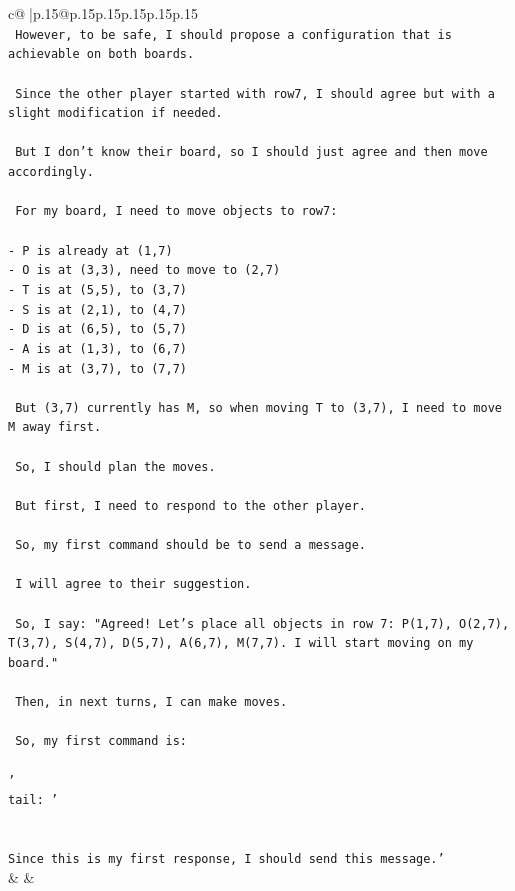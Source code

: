 \documentclass{article}
\begin{document}
{\begin{supertabular}{c@{$\;$}|p{.15\linewidth}@{}p{.15\linewidth}p{.15\linewidth}p{.15\linewidth}p{.15\linewidth}p{.15\linewidth}}
{{{\\ 
\texttt{ However, to be safe, I should propose a configuration that is achievable on both boards.} \\
\\ 
\texttt{ Since the other player started with row7, I should agree but with a slight modification if needed.} \\
\\ 
\texttt{ But I don't know their board, so I should just agree and then move accordingly.} \\
\\ 
\texttt{ For my board, I need to move objects to row7:} \\
\\ 
\texttt{{-} P is already at (1,7)} \\
\texttt{{-} O is at (3,3), need to move to (2,7)} \\
\texttt{{-} T is at (5,5), to (3,7)} \\
\texttt{{-} S is at (2,1), to (4,7)} \\
\texttt{{-} D is at (6,5), to (5,7)} \\
\texttt{{-} A is at (1,3), to (6,7)} \\
\texttt{{-} M is at (3,7), to (7,7)} \\
\\ 
\texttt{ But (3,7) currently has M, so when moving T to (3,7), I need to move M away first.} \\
\\ 
\texttt{ So, I should plan the moves.} \\
\\ 
\texttt{ But first, I need to respond to the other player.} \\
\\ 
\texttt{ So, my first command should be to send a message.} \\
\\ 
\texttt{ I will agree to their suggestion.} \\
\\ 
\texttt{ So, I say: "Agreed! Let's place all objects in row 7: P(1,7), O(2,7), T(3,7), S(4,7), D(5,7), A(6,7), M(7,7). I will start moving on my board."} \\
\\ 
\texttt{ Then, in next turns, I can make moves.} \\
\\ 
\texttt{ So, my first command is:} \\
\\ 
\texttt{'} \\
\texttt{tail: '} \\
\\ 
\\ 
\texttt{Since this is my first response, I should send this message.'} \\
            }
        }
    }
    & & \\ \\


\end{supertabular}}
\end{document}
